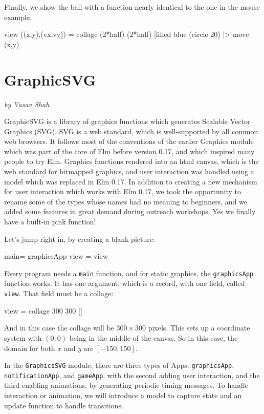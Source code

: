 \documentclass[12pt]{amsbook}
\begin{document}
Finally, we show the ball with a function nearly identical to the one in the mouse example.
\begin{code}
view ((x,y),(vx,vy)) =
  collage (2*half) (2*half) [filled blue (circle 20) |> move (x,y)
\end{code}

\chapter{GraphicSVG}

\hfill{}\emph{ by Vasav Shah}
\medskip

GraphicSVG is a library of graphics functions which generates
Scalable Vector Graphics (SVG).
SVG is a web standard, which is well-supported by all common web browsers. 
It follows most of the conventions of the earlier 
Graphics module which was part of the core of Elm before version 0.17,
and which inspired many people to try Elm.
Graphics functions rendered into an html canvas,
which is the web standard for bitmapped graphics,
and user interaction was handled using a model which was replaced in Elm 0.17.
In addition to creating a new mechanism for user interaction which works with
Elm 0.17, we took the opportunity to rename some of the types whose names had 
no meaning to beginners, and we added some features in great demand during outreach workshops.  Yes we finally have a built-in pink function!

Let's jump right in, by creating a blank picture:
\begin{code}
main= graphicsApp { view = view }	
\end{code}
%
Every program needs a \verb|main| function,
and for static graphics, the \verb|graphicsApp| function works.
It has one argument, which is a record, with one field, called \verb|view|.
That field must be a collage:
\begin{code}
view = collage 300 300 []
\end{code}
And in this case the collage will be $300\times300$ pixels.
This sets up a coordinate system with $(0,0)$ being in the middle of the canvas. So in this case, the domain for both $x$ and $y$ are $[-150,150]$.

In the \verb|GraphicsSVG| module, there are three types of Apps: \verb|graphicsApp|, \verb|notificationApp|, and \verb|gameApp|, with the second adding user interaction, 
and the third enabling animations, by generating periodic timing messages.
To handle interaction or animation,
we will introduce a model to capture state and an update function to handle transitions.
\end{document}
